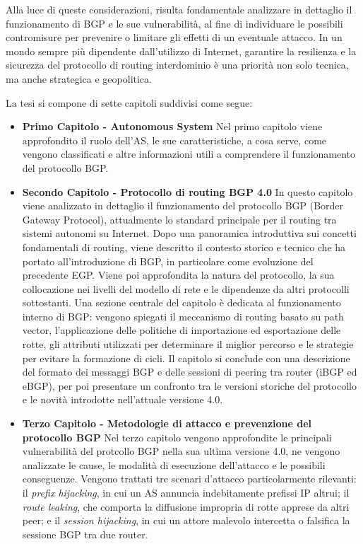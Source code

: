 \documentclass[12pt,a4paper,twoside]{book}
\begin{document}
Alla luce di queste considerazioni, risulta fondamentale analizzare in dettaglio il funzionamento di \ac{BGP} e le sue vulnerabilità, al fine di individuare le possibili contromisure per prevenire o limitare gli effetti di un eventuale attacco. In un mondo sempre più dipendente dall'utilizzo di Internet, garantire la resilienza e la sicurezza del protocollo di routing interdominio è una priorità non solo tecnica, ma anche strategica e geopolitica.

La tesi si compone di sette capitoli suddivisi come segue:

\begin{itemize}
    \item \textbf{Primo Capitolo - Autonomous System} Nel primo capitolo viene approfondito il ruolo dell'\ac{AS}, le sue caratteristiche, a cosa serve, come vengono classificati e altre informazioni utili a comprendere il funzionamento del protocollo \ac{BGP}.
    \item \textbf{Secondo Capitolo - Protocollo di routing BGP 4.0} In questo capitolo viene analizzato in dettaglio il funzionamento del protocollo \ac{BGP} (Border Gateway Protocol), attualmente lo standard principale per il routing tra sistemi autonomi su Internet. Dopo una panoramica introduttiva sui concetti fondamentali di routing, viene descritto il contesto storico e tecnico che ha portato all’introduzione di BGP, in particolare come evoluzione del precedente \ac{EGP}. Viene poi approfondita la natura del protocollo, la sua collocazione nei livelli del modello di rete e le dipendenze da altri protocolli sottostanti.
    Una sezione centrale del capitolo è dedicata al funzionamento interno di BGP: vengono spiegati il meccanismo di routing basato su path vector, l'applicazione delle politiche di importazione ed esportazione delle rotte, gli attributi utilizzati per determinare il miglior percorso e le strategie per evitare la formazione di cicli.
    Il capitolo si conclude con una descrizione del formato dei messaggi BGP e delle sessioni di peering tra router (iBGP ed eBGP), per poi presentare un confronto tra le versioni storiche del protocollo e le novità introdotte nell’attuale versione 4.0.
    \item \textbf{Terzo Capitolo - Metodologie di attacco e prevenzione del protocollo BGP} Nel terzo capitolo vengono approfondite le principali vulnerabilità del protcollo \ac{BGP} nella sua ultima versione 4.0, ne vengono analizzate le cause, le modalità di esecuzione dell'attacco e le possibili conseguenze.
    Vengono trattati tre scenari d'attacco particolarmente rilevanti: il \textit{prefix hijacking}, in cui un \ac{AS} annuncia indebitamente prefissi IP altrui; il \textit{route leaking}, che comporta la diffusione impropria di rotte apprese da altri peer; e il \textit{session hijacking}, in cui un attore malevolo intercetta o falsifica la sessione \ac{BGP} tra due router.

\end{itemize}
\end{document}
